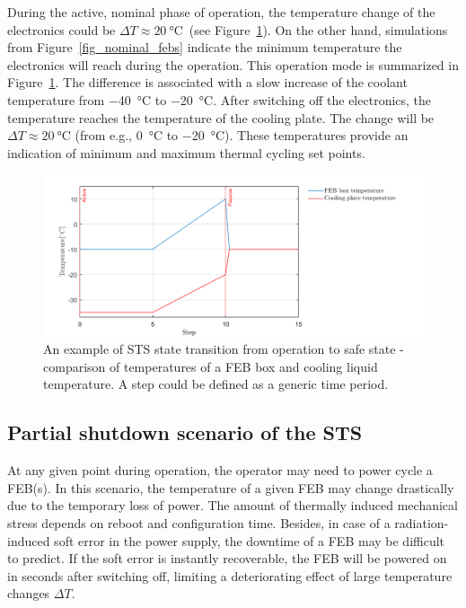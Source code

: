 During the active, nominal phase of operation, the temperature change of the electronics could be $\Delta T \approx \SI{20}{\celsius}$~(see Figure~\ref{fig_nominal_scenario}). On the other hand, simulations from Figure~\ref{fig_nominal_febs} indicate the minimum temperature the electronics will reach during the operation. This operation mode is summarized in Figure~\ref{fig_nominal_scenario}.  The difference is associated with a slow increase of the coolant temperature from \SI{-40}{\celsius} to \SI{-20}{\celsius}. After switching off the electronics, the temperature reaches the temperature of the cooling plate. The change will be $\Delta T \approx \SI{20}{\celsius}$ (from e.g., \SI{0}{\celsius} to \SI{-20}{\celsius}). These temperatures provide an indication of minimum and maximum thermal cycling set points.  

\begin{figure}[!h]
\centering
\includegraphics[width=0.85\columnwidth]{Chapter4/images/nominal_all.png}
\caption{An example of \gls{STS} state transition from operation to safe state - comparison of temperatures of a \gls{FEB} box and cooling liquid temperature. A step could be defined as a generic time period.}
\label{fig_nominal_scenario}
\end{figure}


\subsection{Partial shutdown scenario of the STS}
\label{reboot}

At any given point during operation, the operator may need to power cycle a \gls{FEB}(s). In this scenario, the temperature of a given \gls{FEB} may change drastically due to the temporary loss of power. The amount of thermally induced mechanical stress depends on reboot and configuration time. Besides, in case of a radiation-induced soft error in the power supply, the downtime of a \gls{FEB} may be difficult to predict. If the soft error is instantly recoverable, the FEB will be powered on in seconds after switching off, limiting a deteriorating effect of large temperature changes $\Delta T$.


